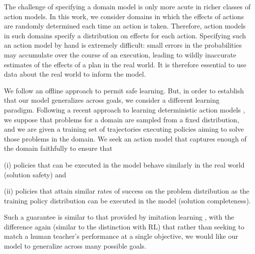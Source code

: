 \documentclass[letterpaper]{article} %
\begin{document}
The challenge of specifying a domain model is only more acute in richer classes of action models. 
In this work, we consider domains in which the effects of actions are randomly determined each time an action is taken. Therefore, action models in such domains specify a distribution on effects for each action. 
Specifying such an action model by hand is extremely difficult: small errors in the probabilities may accumulate over the course of an execution, leading to wildly inaccurate estimates of the effects of a plan in the real world. 
It is therefore essential to use data about the real world to inform the model.



 

We follow an offline approach to permit safe learning. But, in order to establish that our model generalizes across goals, we consider a different learning paradigm. 
Following a recent approach to learning deterministic action models \cite{stern2017efficientAndSafe,juba2021kr}, we suppose that problems for a domain are sampled from a fixed distribution, and we are given a training set of trajectories executing policies aiming to solve those problems in the domain.
We seek an action model that captures enough of the domain faithfully to ensure that
\begin{compactenum}
    \item[(i)] policies that can be executed in the model behave similarly in the real world (solution safety) and 
    \item[(ii)] policies that attain similar rates of success on the problem distribution as the training policy distribution can be executed in the model (solution completeness).
\end{compactenum}
Such a guarantee is similar to that provided by imitation learning %
\cite{osa2018algorithmic,khardon1999l2act}, 
with the difference again (similar to the distinction with RL) that rather than seeking to match a human teacher's performance at a single objective, we would like our model to generalize across many possible goals.
\end{document}
